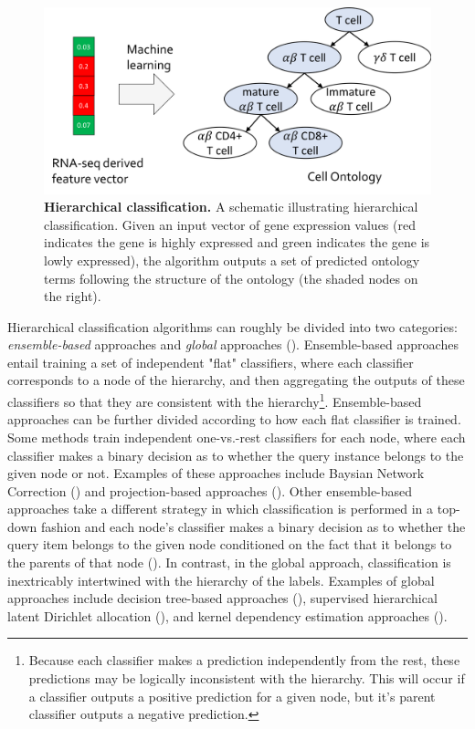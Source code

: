 \begin{figure}[!tpb]
\centerline{\includegraphics[width=13cm]{figures/hierarchical_classification.png}}
\caption{\textbf{Hierarchical classification.} A schematic illustrating hierarchical classification. Given an input vector of gene expression values (red indicates the gene is highly expressed and green indicates the gene is lowly expressed), the algorithm outputs a set of predicted ontology terms following the structure of the ontology (the shaded nodes on the right).}
\label{fig:hierarchical_classification}
\end{figure}

Hierarchical classification algorithms can roughly be divided into two categories: \textit{ensemble-based} approaches and \textit{global} approaches (\citealp{Silla2011}).  Ensemble-based approaches entail training a set of independent "flat" classifiers, where each classifier corresponds to a node of the hierarchy, and then aggregating the outputs of these classifiers so that they are consistent with the hierarchy\footnote{Because each classifier makes a prediction independently from the rest, these predictions may be logically inconsistent with the hierarchy. This will occur if a classifier outputs a positive prediction for a given node, but it's parent classifier outputs a negative prediction.}.  Ensemble-based approaches can be further divided according to how each flat classifier is trained. Some methods train independent one-vs.-rest classifiers for each node, where each classifier makes a binary decision as to whether the query instance belongs to the given node or not. Examples of these approaches include Baysian Network Correction (\citealp{BarutcuogluSchapireTroyanskaya2006}) and projection-based approaches (\citealp{Obozinski2008}).  Other ensemble-based approaches take a different strategy in which classification is performed in a top-down fashion and each node's classifier makes a binary decision as to whether the query item belongs to the given node conditioned on the fact that it belongs to the parents of that node (\citealp{Obozinski2008, CesaBianchi2006}). In contrast, in the global approach, classification is inextricably intertwined with the hierarchy of the labels. Examples of global approaches include decision tree-based approaches (\citealp{Vens2008}), supervised hierarchical latent Dirichlet allocation (\citealp{Perotte2011}), and kernel dependency estimation approaches (\citealp{Bi2011}).  
  
